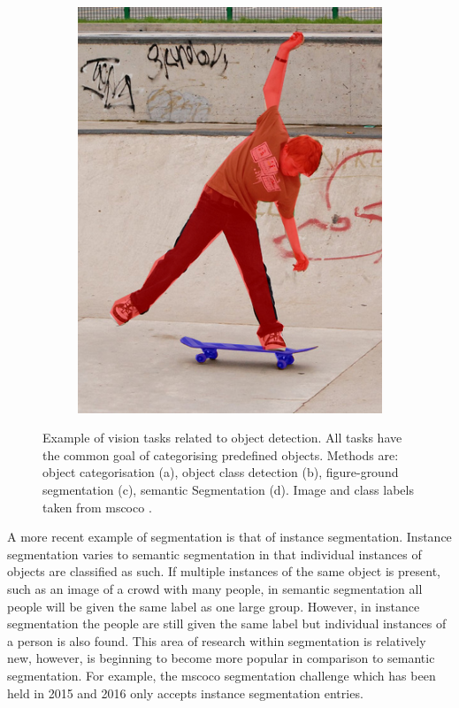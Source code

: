 \begin{figure}[H]
\begin{subfigure}[b]{0.2\textwidth}
        \includegraphics[width=\textwidth]{Figs/Problem/objfieldssegmentation.png}
        \caption{}\label{fig:objseg}
    \end{subfigure}
    \caption{Example of vision tasks related to object detection. All tasks have the common goal of categorising predefined objects. Methods are: object categorisation (a), object class detection (b), figure-ground segmentation (c), semantic Segmentation (d). Image and class labels taken from \gls{mscoco} \cite{mscoco}.}
    \label{fig:objfields}
\end{figure} 

A more recent example of segmentation is that of instance segmentation. Instance segmentation varies to semantic segmentation in that individual instances of objects are classified as such. If multiple instances of the same object is present, such as an image of a crowd with many people, in semantic segmentation all people will be given the same label as one large group. However, in instance segmentation the people are still given the same label but individual instances of a person is also found. This area of research within segmentation is relatively new, however, is beginning to become more popular in comparison to semantic segmentation. For example, the \gls{mscoco} segmentation challenge which has been held in 2015 and 2016 only accepts instance segmentation entries.


